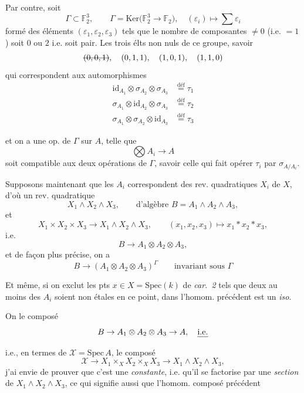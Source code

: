 \documentclass[11pt,a4paper]{article}
\begin{document}
Par contre, soit
\[
  \Gamma \subset \mathbb{F}_2^3 , \qquad
  \Gamma = \mathrm{Ker}\bigl(\mathbb{F}_2^3 \to \mathbb{F}_2\bigr) , \quad (\varepsilon_i) \mapsto \textstyle\sum \varepsilon_i
\]
formé des éléments $(\varepsilon_1, \varepsilon_2, \varepsilon_3)$ tels que le nombre de composantes $\neq 0$ (i.e. $= 1$) soit $0$ ou $2$ i.e. soit pair. Les \struck{\ill{}} trois élts non nuls de ce groupe, savoir
\[
  \text{\struck{$(0,0,1)$}}, \quad (0,1,1) , \quad (1,0,1) , \quad (1,1,0)
\]
qui correspondent aux automorphismes
\[
  \begin{aligned}
    \mathrm{id}_{A_1} \otimes \sigma_{A_2} \otimes \sigma_{A_3} &\overset{\mathrm{déf}}{=} \tau_1 \\
    \sigma_{A_1} \otimes \mathrm{id}_{A_2} \otimes \sigma_{A_3} &\overset{\mathrm{déf}}{=} \tau_2 \\
    \sigma_{A_1} \otimes \sigma_{A_2} \otimes \mathrm{id}_{A_3} &\overset{\mathrm{déf}}{=} \tau_3
  \end{aligned}
\]

et  on a une \struck{\ill{}} op. de $\Gamma$ sur $A$, telle que
\[
  \textstyle\bigotimes A_i \to A
\]
soit compatible aux deux opérations de $\Gamma$, savoir celle qui fait opérer $\tau_i$ par $\sigma_{A/A_i}$.

 Supposons maintenant que les $A_i$ correspondent  des rev. quadratiques $X_i$ de $X$, d'où  un rev. quadratique
\[
  X_1 \wedge X_2 \wedge X_3 , \qquad \text{d'algèbre } B = A_1 \wedge A_2 \wedge A_3 ,
\]
et 
\[
  X_1 \times X_2 \times X_3 \to X_1 \wedge X_2 \wedge X_3 , \qquad
  (x_1, x_2, x_3) \mapsto x_1 * x_2 * x_3 ,
\]
i.e.
\[
  B \to A_1 \otimes A_2 \otimes A_3 ,
\]
et de façon plus précise, on a
\[
  B \to (A_1 \otimes A_2 \otimes A_3)^{\Gamma} \qquad \text{invariant sous } \Gamma
\]

Et même, si on exclut les pts $x \in X = \mathrm{Spec}(k)$ de \emph{car.~2} tels que deux au moins des $A_i$ soient non étales en ce point, dans l'homom. précédent est un \emph{iso}.

On   le composé
\[
  B \to A_1 \otimes A_2 \otimes A_3 \to A , \quad \text{\uncertain{i.e.}}
\]

i.e., en termes de $\mathcal{X} = \mathrm{Spec}\, A$, le composé
\[
  \mathcal{X} \to X_1 \times_X X_2 \times_X X_3 \to X_1 \wedge X_2 \wedge X_3 ,
\]
j'ai envie de prouver que c'est une  \emph{constante}, i.e. qu'il se factorise par une \emph{section} de $X_1 \wedge X_2 \wedge X_3$, ce qui signifie aussi que l'homom. composé précédent
\end{document}

